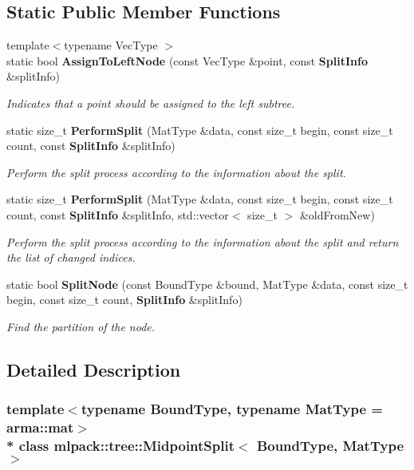 \subsection*{Static Public Member Functions}
\begin{DoxyCompactItemize}
\item 
{\footnotesize template$<$typename Vec\+Type $>$ }\\static bool {\bf Assign\+To\+Left\+Node} (const Vec\+Type \&point, const {\bf Split\+Info} \&split\+Info)
\begin{DoxyCompactList}\small\item\em Indicates that a point should be assigned to the left subtree. \end{DoxyCompactList}\item 
static size\+\_\+t {\bf Perform\+Split} (Mat\+Type \&data, const size\+\_\+t begin, const size\+\_\+t count, const {\bf Split\+Info} \&split\+Info)
\begin{DoxyCompactList}\small\item\em Perform the split process according to the information about the split. \end{DoxyCompactList}\item 
static size\+\_\+t {\bf Perform\+Split} (Mat\+Type \&data, const size\+\_\+t begin, const size\+\_\+t count, const {\bf Split\+Info} \&split\+Info, std\+::vector$<$ size\+\_\+t $>$ \&old\+From\+New)
\begin{DoxyCompactList}\small\item\em Perform the split process according to the information about the split and return the list of changed indices. \end{DoxyCompactList}\item 
static bool {\bf Split\+Node} (const Bound\+Type \&bound, Mat\+Type \&data, const size\+\_\+t begin, const size\+\_\+t count, {\bf Split\+Info} \&split\+Info)
\begin{DoxyCompactList}\small\item\em Find the partition of the node. \end{DoxyCompactList}\end{DoxyCompactItemize}


\subsection{Detailed Description}
\subsubsection*{template$<$typename Bound\+Type, typename Mat\+Type = arma\+::mat$>$\\*
class mlpack\+::tree\+::\+Midpoint\+Split$<$ Bound\+Type, Mat\+Type $>$}

